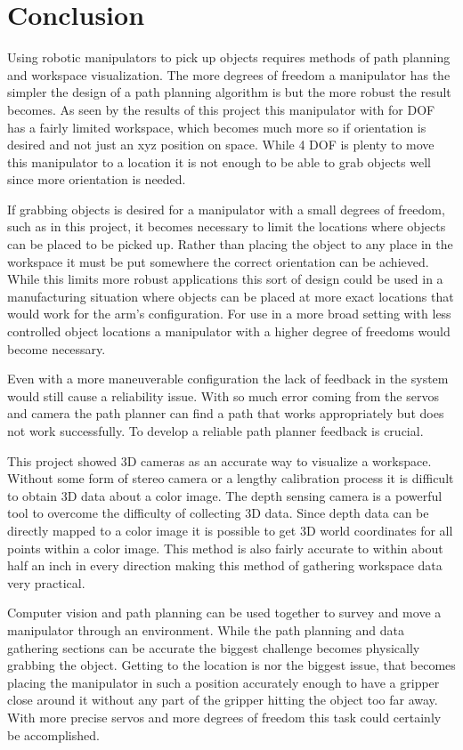 \chapter{Conclusion}
Using robotic manipulators to pick up objects requires methods of path planning and workspace visualization. The more degrees of freedom a manipulator has the simpler the design of a path planning algorithm is but the more robust the result becomes. As seen by the results of this project this manipulator with for DOF has a fairly limited workspace, which becomes much more so if orientation is desired and not just an xyz position on space. While 4 DOF is plenty to move this manipulator to a location it is not enough to be able to grab objects well since more orientation is needed. 

If grabbing objects is desired for a manipulator with a small degrees of freedom, such as in this project, it becomes necessary to limit the locations where objects can be placed to be picked up. Rather than placing the object to any place in the workspace it must be put somewhere the correct orientation can be achieved. While this limits more robust applications this sort of design could be used in a manufacturing situation where objects can be placed at more exact locations that would work for the arm's configuration. For use in a more broad setting with less controlled object locations a manipulator with a higher degree of freedoms would become necessary.

Even with a more maneuverable configuration the lack of feedback in the system would still cause a reliability issue. With so much error coming from the servos and camera the path planner can find a path that works appropriately but does not work successfully. To develop a reliable path planner feedback is crucial.  

This project showed 3D cameras as an accurate way to visualize a workspace. Without some form of stereo camera or a lengthy calibration process it is difficult to obtain 3D data about a color image. The depth sensing camera is a powerful tool to overcome the difficulty of collecting 3D data. Since depth data can be directly mapped to a color image it is possible to get 3D world coordinates for all points within a color image. This method is also fairly accurate to within about half an inch in every direction making this method of gathering workspace data very practical. 

Computer vision and path planning can be used together to survey and move a manipulator through an environment. While the path planning and data gathering sections can be accurate the biggest challenge becomes physically grabbing the object. Getting to the location is nor the biggest issue, that becomes placing the manipulator in such a position accurately enough to have a gripper close around it without any part of the gripper hitting the object too far away. With more precise servos and more degrees of freedom this task could certainly be accomplished.